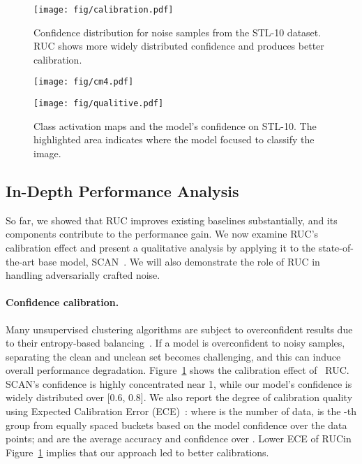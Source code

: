 \documentclass[final]{cvpr}
\newcommand{\model}{\textsf{RUC}}
\newcommand{\cutparagraphup}{\vspace*{-0.15in}}
\begin{document}
\begin{figure}[t!]
\centering

\texttt{[image: fig/calibration.pdf]}
    \caption{Confidence distribution for noise samples from the STL-10 dataset. \model{} shows more widely distributed confidence and produces better calibration.} 
    \label{fig:calibration}
\end{figure}


\begin{figure*}[t!]
\centering
\begin{minipage}{0.55\textwidth}
\captionsetup{width=.95\linewidth}
\texttt{[image: fig/cm4.pdf]}
    \caption{Confusion matrices of the SCAN and SCAN+\model~results on STL-10. The row names are predicted class labels, and the columns are the ground-truths.}
    \label{fig:confusion_matrix}
\end{minipage}
\hspace{0.18cm}
\begin{minipage}{0.41\textwidth}
\captionsetup{width=.9\columnwidth}
\texttt{[image: fig/qualitive.pdf]}
    \caption{Class activation maps and the model's confidence on STL-10. The highlighted area indicates where the model focused to classify the image.
    }
    \label{fig:qualitive}
\end{minipage}
\vspace{-0.1in}
\end{figure*}

\subsection{In-Depth Performance Analysis} 
So far, we showed that \model{} improves existing baselines substantially, and its components contribute to the performance gain. We now examine \model{}'s calibration effect and present a qualitative analysis by applying it to the state-of-the-art base model, SCAN~\cite{van2020scan}. We will also demonstrate the role of \model{} in handling adversarially crafted noise. 


\cutparagraphup
\paragraph{Confidence calibration.} Many unsupervised clustering algorithms are subject to overconfident results due to their entropy-based balancing~\cite{hanmitigating,van2020scan}. If a model is overconfident to noisy samples, separating the clean and unclean set becomes challenging, and this can induce overall performance degradation. Figure~\ref{fig:calibration} shows the calibration effect of ~\model. SCAN's confidence is highly concentrated near 1, while our model's confidence is widely distributed over [0.6, 0.8]. 
We also report the degree of calibration quality using Expected Calibration Error (ECE)~\cite{guo2017calibration}:
 where  is the number of data,  is the -th group from equally spaced buckets based on the model confidence over the data points;  and  are the average accuracy and confidence over . Lower ECE of \model \space in Figure~\ref{fig:calibration} implies that our approach led to better calibrations. 
\end{document}
